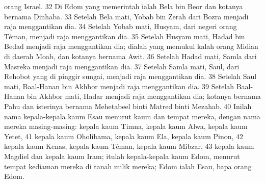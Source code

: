 \begin{biblechapter}
orang Israel. 32 Di Edom yang memerintah ialah Bela bin Beor dan kotanya bernama Dinhaba. 33 Setelah Bela mati, Yobab bin Zerah dari Bozra menjadi raja menggantikan dia. 34 Setelah Yobab mati, Husyam, dari negeri orang Téman, menjadi raja menggantikan dia. 35 Setelah Husyam mati, Hadad bin Bedad menjadi raja menggantikan dia; dialah yang memukul kalah orang Midian di daerah Moab, dan kotanya bernama Awit. 36 Setelah Hadad mati, Samla dari Masreka menjadi raja menggantikan dia. 37 Setelah Samla mati, Saul, dari Rehobot yang di pinggir sungai, menjadi raja menggantikan dia. 38 Setelah Saul mati, Baal-Hanan bin Akhbor menjadi raja menggantikan dia. 39 Setelah Baal-Hanan bin Akhbor mati, Hadar menjadi raja menggantikan dia; kotanya bernama Pahu dan isterinya bernama Mehetabeel binti Matred binti Mezahab. 40 Inilah nama kepala-kepala kaum Esau menurut kaum dan tempat mereka, dengan nama mereka masing-masing: kepala kaum Timna, kepala kaum Alwa, kepala kaum Yetet, 41 kepala kaum Oholibama, kepala kaum Ela, kepala kaum Pinon, 42 kepala kaum Kenas, kepala kaum Téman, kepala kaum Mibzar, 43 kepala kaum Magdiel dan kepala kaum Iram; itulah kepala-kepala kaum Edom, menurut tempat kediaman mereka di tanah milik mereka; Edom ialah Esau, bapa orang Edom.
\end{biblechapter}

